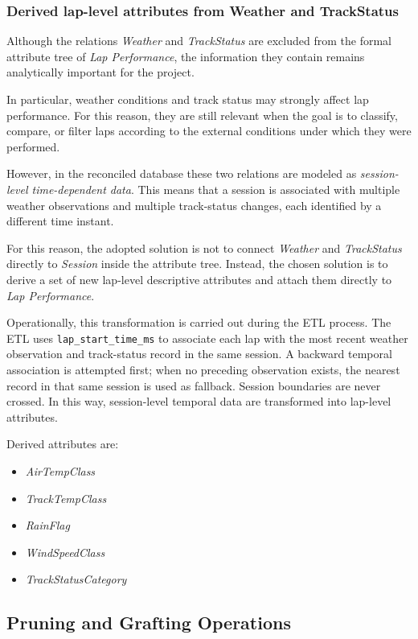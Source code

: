 \documentclass[a4paper,11pt]{article}
\begin{document}
	\subsubsection{Derived lap-level attributes from Weather and TrackStatus}
	
	Although the relations \textit{Weather} and \textit{TrackStatus} are excluded from the formal attribute tree of \textit{Lap Performance}, the information they contain remains analytically important for the project.
	
	In particular, weather conditions and track status may strongly affect lap performance.
	For this reason, they are still relevant when the goal is to classify, compare, or filter laps according to the external conditions under which they were performed.
	
	However, in the reconciled database these two relations are modeled as \textit{session-level time-dependent data}.
	This means that a session is associated with multiple weather observations and multiple track-status changes, each identified by a different time instant.
	
	For this reason, the adopted solution is not to connect \textit{Weather} and \textit{TrackStatus} directly to \textit{Session} inside the attribute tree.
	Instead, the chosen solution is to derive a set of new lap-level descriptive attributes and attach them directly to \textit{Lap Performance}.
	
	Operationally, this transformation is carried out during the ETL process.
	The ETL uses \texttt{lap\_start\_time\_ms} to associate each lap with the most recent
	weather observation and track-status record in the same session. A backward temporal
	association is attempted first; when no preceding observation exists, the nearest record
	in that same session is used as fallback. Session boundaries are never crossed.
	In this way, session-level temporal data are transformed into lap-level attributes.
	
	Derived attributes are:
	\begin{itemize}
		\item \textit{AirTempClass}
		\item \textit{TrackTempClass}
		\item \textit{RainFlag}
		\item \textit{WindSpeedClass}
		\item \textit{TrackStatusCategory}
	\end{itemize}
	

	\subsection{Pruning and Grafting Operations}
	
\end{document}

